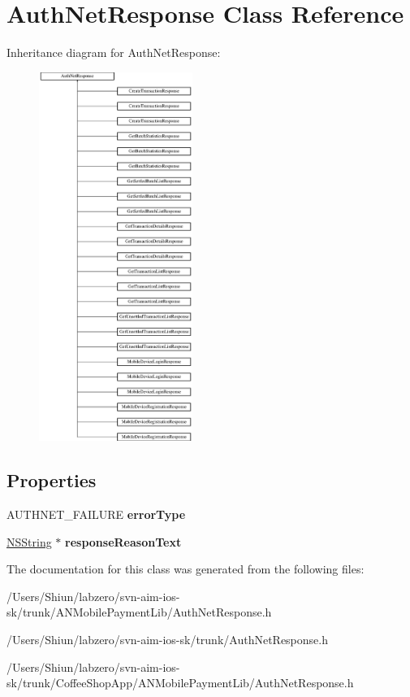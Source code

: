 \hypertarget{interface_auth_net_response}{
\section{AuthNetResponse Class Reference}
\label{interface_auth_net_response}
}
Inheritance diagram for AuthNetResponse:\begin{figure}[H]
\begin{center}
\leavevmode
\includegraphics[height=12.000000cm]{interface_auth_net_response}
\end{center}
\end{figure}
\subsection*{Properties}
\begin{DoxyCompactItemize}
\item 
\hypertarget{interface_auth_net_response_a405b115df6149e1cc121beca204eceac}{
AUTHNET\_\-FAILURE {\bfseries errorType}}
\label{interface_auth_net_response_a405b115df6149e1cc121beca204eceac}

\item 
\hypertarget{interface_auth_net_response_a7f928daafe6528ae6c408d6a08691e92}{
\hyperlink{class_n_s_string}{NSString} $\ast$ {\bfseries responseReasonText}}
\label{interface_auth_net_response_a7f928daafe6528ae6c408d6a08691e92}

\end{DoxyCompactItemize}


The documentation for this class was generated from the following files:\begin{DoxyCompactItemize}
\item 
/Users/Shiun/labzero/svn-\/aim-\/ios-\/sk/trunk/ANMobilePaymentLib/AuthNetResponse.h\item 
/Users/Shiun/labzero/svn-\/aim-\/ios-\/sk/trunk/AuthNetResponse.h\item 
/Users/Shiun/labzero/svn-\/aim-\/ios-\/sk/trunk/CoffeeShopApp/ANMobilePaymentLib/AuthNetResponse.h\end{DoxyCompactItemize}
